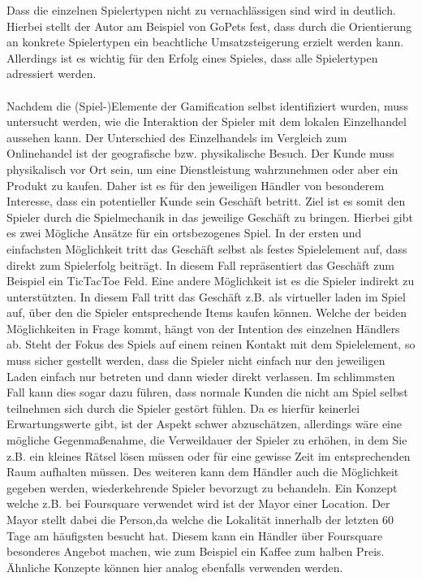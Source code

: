 Dass die einzelnen Spielertypen nicht zu vernachlässigen sind wird in \cite{Bromley.2013} deutlich. Hierbei stellt der Autor am Beispiel von GoPets fest, dass durch die Orientierung an konkrete Spielertypen ein beachtliche Umsatzsteigerung erzielt werden kann. \cite{Bethke.2007} Allerdings ist es wichtig für den Erfolg eines Spieles, dass alle Spielertypen adressiert werden.
\\\\
Nachdem die (Spiel-)Elemente der Gamification selbst identifiziert wurden, muss untersucht werden, wie die Interaktion der Spieler mit dem lokalen Einzelhandel aussehen kann.
Der Unterschied des Einzelhandels im Vergleich zum Onlinehandel ist der geografische bzw. physikalische Besuch. Der Kunde muss physikalisch vor Ort sein, um eine Dienstleistung wahrzunehmen oder aber ein Produkt zu kaufen. Daher ist es für den jeweiligen Händler von besonderem Interesse, dass ein potentieller Kunde sein Geschäft betritt.
Ziel ist es somit den Spieler durch die Spielmechanik in das jeweilige Geschäft zu bringen.
Hierbei gibt es zwei Mögliche Ansätze für ein ortsbezogenes Spiel. In der ersten und einfachsten Möglichkeit tritt das Geschäft selbst als festes Spielelement auf, dass direkt zum Spielerfolg beiträgt. In diesem Fall repräsentiert das Geschäft zum Beispiel ein TicTacToe Feld. Eine andere Möglichkeit ist es die Spieler indirekt zu unterstützten. In diesem Fall tritt das Geschäft z.B. als virtueller laden im Spiel auf, über den die Spieler entsprechende Items kaufen können.
Welche der beiden Möglichkeiten in Frage kommt, hängt von der Intention des einzelnen Händlers ab. Steht der Fokus des Spiels auf einem reinen Kontakt mit dem Spielelement, so 
muss sicher gestellt werden, dass die Spieler nicht einfach nur den jeweiligen Laden einfach nur betreten und dann wieder direkt verlassen. Im schlimmsten Fall kann dies sogar dazu führen, dass normale Kunden die nicht am Spiel selbst teilnehmen sich durch die Spieler gestört fühlen.
Da es hierfür keinerlei Erwartungswerte gibt, ist der Aspekt schwer abzuschätzen, allerdings wäre eine mögliche Gegenmaßenahme, die Verweildauer der Spieler zu erhöhen, in dem Sie z.B. ein kleines Rätsel lösen müssen oder für eine gewisse Zeit im entsprechenden Raum aufhalten müssen.
Des weiteren kann dem Händler auch die Möglichkeit gegeben werden, wiederkehrende Spieler bevorzugt zu behandeln. Ein Konzept welche z.B. bei Foursquare verwendet wird ist der Mayor einer Location. Der Mayor stellt dabei die Person,da welche die Lokalität innerhalb der letzten 60 Tage am häufigsten besucht hat. Diesem kann ein Händler über Foursquare besonderes Angebot machen, wie zum Beispiel ein Kaffee zum halben Preis.\cite{Lindqvist.2011} Ähnliche Konzepte können hier analog ebenfalls verwenden werden.
